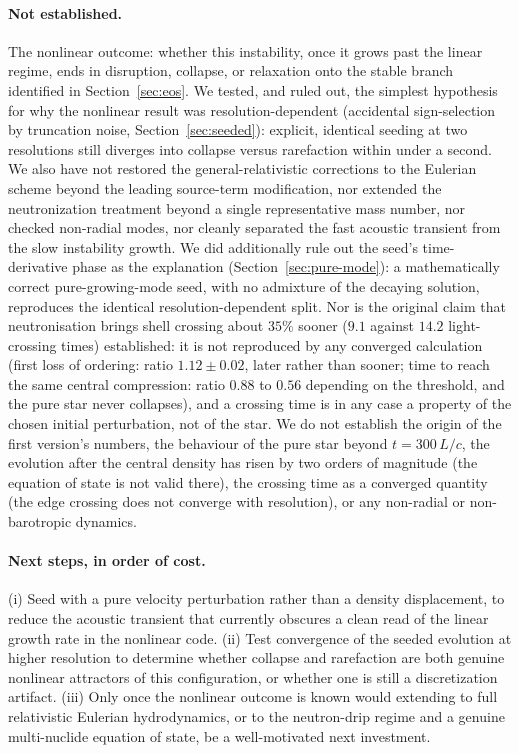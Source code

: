\documentclass[11pt]{article}
\begin{document}
\paragraph{Not established.} The nonlinear outcome: whether this instability, once it grows past the linear regime, ends in disruption, collapse, or relaxation onto the stable branch identified in Section~\ref{sec:eos}. We tested, and ruled out, the simplest hypothesis for why the nonlinear result was resolution-dependent (accidental sign-selection by truncation noise, Section~\ref{sec:seeded}): explicit, identical seeding at two resolutions still diverges into collapse versus rarefaction within under a second. We also have not restored the general-relativistic corrections to the Eulerian scheme beyond the leading source-term modification, nor extended the neutronization treatment beyond a single representative mass number, nor checked non-radial modes, nor cleanly separated the fast acoustic transient from the slow instability growth. We did additionally rule out the seed's time-derivative phase as the explanation (Section~\ref{sec:pure-mode}): a mathematically correct pure-growing-mode seed, with no admixture of the decaying solution, reproduces the identical resolution-dependent split. Nor is the original claim that neutronisation brings shell crossing about $35\%$ sooner ($9.1$ against $14.2$ light-crossing times) established: it is not reproduced by any converged calculation (first loss of ordering: ratio $1.12\pm0.02$, later rather than sooner; time to reach the same central compression: ratio $0.88$ to $0.56$ depending on the threshold, and the pure star never collapses), and a crossing time is in any case a property of the chosen initial perturbation, not of the star. We do not establish the origin of the first version's numbers, the behaviour of the pure star beyond $t=300\,L/c$, the evolution after the central density has risen by two orders of magnitude (the equation of state is not valid there), the crossing time as a converged quantity (the edge crossing does not converge with resolution), or any non-radial or non-barotropic dynamics.

\paragraph{Next steps, in order of cost.} (i) Seed with a pure velocity perturbation rather than a density displacement, to reduce the acoustic transient that currently obscures a clean read of the linear growth rate in the nonlinear code. (ii) Test convergence of the seeded evolution at higher resolution to determine whether collapse and rarefaction are both genuine nonlinear attractors of this configuration, or whether one is still a discretization artifact. (iii) Only once the nonlinear outcome is known would extending to full relativistic Eulerian hydrodynamics, or to the neutron-drip regime and a genuine multi-nuclide equation of state, be a well-motivated next investment.
\end{document}
